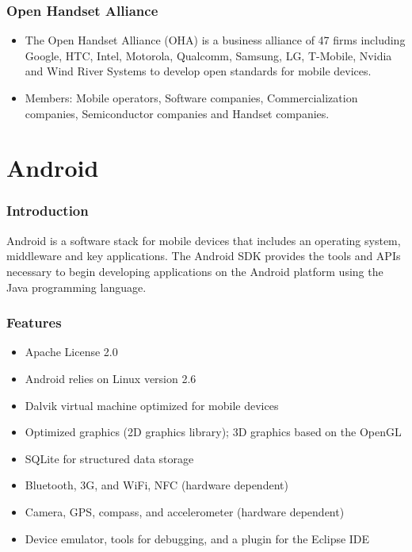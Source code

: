 \documentclass{beamer}
\begin{document}
\begin{frame}
\frametitle{Open Handset Alliance}
\begin{itemize}
\item The Open Handset Alliance (OHA) is a business alliance of 47
  firms including Google, HTC, Intel, Motorola, Qualcomm, Samsung, LG,
  T-Mobile, Nvidia and Wind River Systems to develop open standards
  for mobile devices.
\item Members: Mobile operators, Software companies, Commercialization
  companies, Semiconductor companies and Handset companies.

\begin{center}
\end{center}
\end{itemize}
\end{frame}


\section{Android}


\begin{frame}
\frametitle{Introduction}

Android is a software stack for mobile devices that includes an
operating system, middleware and key applications. The Android SDK
provides the tools and APIs necessary to begin developing applications
on the Android platform using the Java programming language.

\end{frame}

\begin{frame}
\frametitle{Features}
\begin{itemize}
\item Apache License 2.0
\item Android relies on Linux version 2.6
\item Dalvik virtual machine optimized for mobile devices 
\item Optimized graphics (2D graphics library); 3D
  graphics based on the OpenGL
\item SQLite for structured data storage
\item Bluetooth, 3G, and WiFi, NFC (hardware dependent)
\item Camera, GPS, compass, and accelerometer (hardware dependent)
\item Device emulator, tools for debugging, and a plugin for the Eclipse IDE
\end{itemize}
\end{frame}
\end{document}
